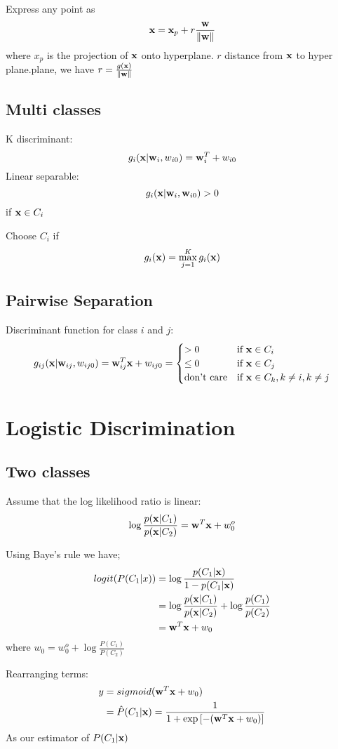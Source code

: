     Express any point as 
    \[\mathbf{x} = \mathbf{x}_p  + r\frac{\mathbf{w}}{\|\mathbf{w}\|}\]
    where $x_p$ is the  projection of $\mathbf{x}$ onto hyperplane. $r$ distance
    from $\mathbf{x}$ to hyper plane.plane, we have $r=\frac{g(\mathbf{x})}{\|\mathbf{w}\|}$
\subsection{Multi classes} 
K discriminant:
\[g_i(\mathbf{x} |\mathbf{w}_i, w_{i0}) = \mathbf{w}_i^T + w_{i0}\]
Linear separable: \[g_i(\mathbf{x}|\mathbf{w}_i, \mathbf{w}_{i0}) > 0\] if $\mathbf{x} \in
        C_i$
        
        Choose $C_i$ if \[g_i(\mathbf{x}) = \max_{j=1}^Kg_i(\mathbf{x})\]

\subsection{Pairwise Separation} 
    Discriminant function for class $i$ and $j$:
        \[
            g_{ij} (\mathbf{x}|\mathbf{w}_{ij}, w_{ij0}) = \mathbf{w}_{ij}^T\mathbf{x} + w_{ij0} =
            \begin{cases}
                > 0 & \mbox{if } \mathbf{x} \in C_i\\
                \leq 0 & \mbox{if } \mathbf{x} \in C_j\\
                \mbox{don't care} & \mbox{if } \mathbf{x} \in C_k, k\neq i, k\neq j
            \end{cases} \]
\section{Logistic Discrimination}
\subsection{Two classes}
     Assume that the log likelihood ratio is linear:
        \[\log\frac{p(\mathbf{x}|C_1)}{p(\mathbf{x}|C_2)} = \mathbf{w}^T\mathbf{x} + w_0^o \]

    Using Baye's rule we have;
        \begin{align*}
            logit(P(C_1|x)) & = \log\frac{p(C_1|\mathbf{x})}{1 - p(C_1|\mathbf{x})} \\
            & = \log\frac{p(\mathbf{x}|C_1)}{p(\mathbf{x}|C_2)} + \log\frac{p(C_1)}{p(C_2)} \\
            & = \mathbf{w}^T\mathbf{x} + w_0
        \end{align*}
        where $w_0 = w_0^o + \log\frac{P(C_1)}{P(C_2)}$

       Rearranging terms: 
        \begin{align*} y  & = sigmoid(\mathbf{w}^T\mathbf{x} + w_0) \\
            & =  \hat{P}(C_1|\mathbf{x}) = \frac{1}{1 + \exp\left[-(\mathbf{w}^T\mathbf{x} + w_0 )\right]}
        \end{align*}
        As our estimator of $P(C_1|\mathbf{x})$


